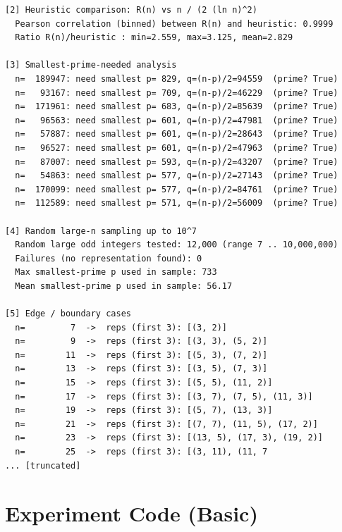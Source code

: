 \documentclass[11pt]{article}
\begin{document}
\begin{lstlisting}
[2] Heuristic comparison: R(n) vs n / (2 (ln n)^2)
  Pearson correlation (binned) between R(n) and heuristic: 0.9999
  Ratio R(n)/heuristic : min=2.559, max=3.125, mean=2.829

[3] Smallest-prime-needed analysis
  n=  189947: need smallest p= 829, q=(n-p)/2=94559  (prime? True)
  n=   93167: need smallest p= 709, q=(n-p)/2=46229  (prime? True)
  n=  171961: need smallest p= 683, q=(n-p)/2=85639  (prime? True)
  n=   96563: need smallest p= 601, q=(n-p)/2=47981  (prime? True)
  n=   57887: need smallest p= 601, q=(n-p)/2=28643  (prime? True)
  n=   96527: need smallest p= 601, q=(n-p)/2=47963  (prime? True)
  n=   87007: need smallest p= 593, q=(n-p)/2=43207  (prime? True)
  n=   54863: need smallest p= 577, q=(n-p)/2=27143  (prime? True)
  n=  170099: need smallest p= 577, q=(n-p)/2=84761  (prime? True)
  n=  112589: need smallest p= 571, q=(n-p)/2=56009  (prime? True)

[4] Random large-n sampling up to 10^7
  Random large odd integers tested: 12,000 (range 7 .. 10,000,000)
  Failures (no representation found): 0
  Max smallest-prime p used in sample: 733
  Mean smallest-prime p used in sample: 56.17

[5] Edge / boundary cases
  n=         7  ->  reps (first 3): [(3, 2)]
  n=         9  ->  reps (first 3): [(3, 3), (5, 2)]
  n=        11  ->  reps (first 3): [(5, 3), (7, 2)]
  n=        13  ->  reps (first 3): [(3, 5), (7, 3)]
  n=        15  ->  reps (first 3): [(5, 5), (11, 2)]
  n=        17  ->  reps (first 3): [(3, 7), (7, 5), (11, 3)]
  n=        19  ->  reps (first 3): [(5, 7), (13, 3)]
  n=        21  ->  reps (first 3): [(7, 7), (11, 5), (17, 2)]
  n=        23  ->  reps (first 3): [(13, 5), (17, 3), (19, 2)]
  n=        25  ->  reps (first 3): [(3, 11), (11, 7
... [truncated]
\end{lstlisting}


\section{Experiment Code (Basic)}
\end{document}

